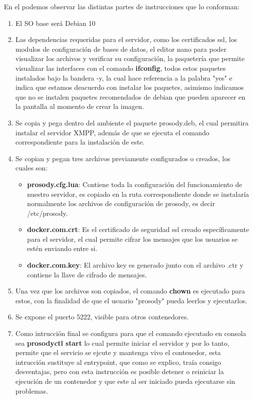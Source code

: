 \documentclass[10pt,letterpaper]{article}
\begin{document}
En el podemos observar las distintas partes de instrucciones que lo conforman:
\begin{enumerate}
\item El SO base será Debian 10

\item Las dependencias requeridas para el servidor, como los certificados ssl, los modulos de configuración de bases de datos, el editor nano para poder visualizar los archivos y verificar su configuración, la paquetería que permite visualizar las interfaces con el comando \textbf{ifconfig}, todos estos paquetes instalados bajo la bandera -y, la cual hace referencia a la palabra "yes" e indica que estamos deacuerdo con instalar los paquetes, asimismo indicamos que no se instalen paquetes recomendados de debian que pueden aparecer en la pantalla al momento de crear la imagen.

\item Se copia y pega dentro del ambiente el paquete prosody.deb, el cual permitira instalar el servidor XMPP, además de que se ejecuta el comando correspondiente para la instalación de este.

\item Se copian y pegan tres archivos previamente configurados o creados, los cuales son:
	\begin{itemize}
	\item \textbf{prosody.cfg.lua}: Contiene toda la configuración del funcionamiento de nuestro servidor, es copiado en la ruta correspondiente donde se instalaría normalmente los archivos de configuración de prosody, es decir /etc/prosody.
	\item \textbf{docker.com.crt}: Es el certificado de seguridad ssl creado específicamente para el servidor, el cual permite cifrar los mensajes que los usuarios se estén enviando entre si.
	\item \textbf{docker.com.key}: El archivo key es generado junto con el archivo .ctr y contiene la llave de cifrado de mensajes.
	\end{itemize}

\item Una vez que los archivos son copiados, el comando \textbf{chown} es ejecutado para estos, con la finalidad de que el usuario "prosody" pueda leerlos y ejecutarlos.

\item Se expone el puerto 5222, visible para otros contenedores.

\item Como intrucción final se configura para que el comando ejecutado en consola sea \textbf{prosodyctl start} lo cual permite iniciar el servidor y por lo tanto, permite que el servicio se ejcute y mantenga vivo el contenedor, esta intrucción sustituye al entrypoint, que como se explico, traía consigo desventajas, pero con esta instrucción es posible detener o reiniciar la ejecución de un contenedor y que este al ser iniciado pueda ejecutarse sin problemas.
\end{enumerate}
\end{document}
